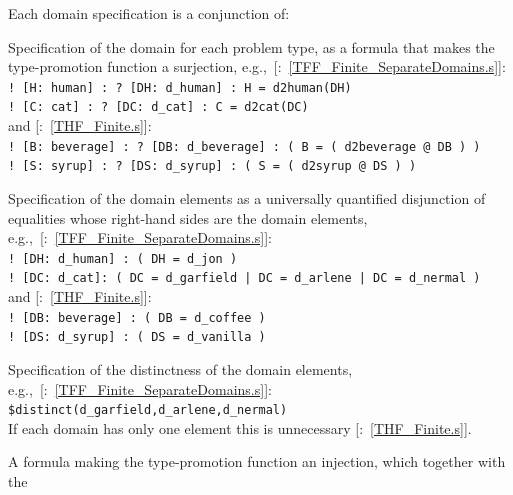 \documentclass{ceurart}
\newcommand{\smalltt}[1]{\small \texttt{#1}}
\newcommand{\example}{{\scriptsize \faFile[regular]}}
\newenvironment{packed_itemize}{
\vspace*{-0.3em}
\begin{itemize}
\setlength{\partopsep}{0pt}
\setlength{\itemsep}{1pt}
\setlength{\parskip}{0pt}
\setlength{\parsep}{0pt}
}{\end{itemize}}
\begin{document}
Each domain specification is a conjunction of:
\begin{packed_itemize}
\item Specification of the domain for each problem type, as a formula that makes the 
      type-promotion function a surjection, 
      e.g.,~[\example{}:~\ref{TFF_Finite_SeparateDomains.s}]:\\
      \hspace*{0.5cm}\smalltt{! [H: human] : ? [DH: d\_human] : H = d2human(DH)}\\
      \hspace*{0.5cm}\smalltt{! [C: cat] : ? [DC: d\_cat] : C = d2cat(DC)}\\
      and [\example{}:~\ref{THF_Finite.s}]:\\
      \hspace*{0.5cm}\smalltt{! [B: beverage] : ? [DB: d\_beverage] : ( B = ( d2beverage @ DB ) )}\\
      \hspace*{0.5cm}\smalltt{! [S: syrup] : ? [DS: d\_syrup] : ( S = ( d2syrup @ DS ) )}
\item Specification of the domain elements as a universally quantified disjunction of equalities 
      whose right-hand sides are the domain elements, 
      e.g.,~[\example{}:~\ref{TFF_Finite_SeparateDomains.s}]:\\
      \hspace*{0.5cm}\smalltt{! [DH: d\_human] : ( DH = d\_jon )}\\
      \hspace*{0.5cm}\smalltt{! [DC: d\_cat]: ( DC = d\_garfield | DC = d\_arlene | DC = d\_nermal )}\\
      and [\example{}:~\ref{THF_Finite.s}]:\\
      \hspace*{0.5cm}\smalltt{! [DB: beverage] : ( DB = d\_coffee )}\\
      \hspace*{0.5cm}\smalltt{! [DS: d\_syrup] : ( DS = d\_vanilla )}
\item Specification of the distinctness of the domain elements, 
      e.g.,~[\example{}:~\ref{TFF_Finite_SeparateDomains.s}]:\\
      \hspace*{0.5cm}\smalltt{\$distinct(d\_garfield,d\_arlene,d\_nermal)}\\
      If each domain has only one element this is unnecessary [\example{}:~\ref{THF_Finite.s}].
\item A formula making the type-promotion function an injection, which together with the 

\end{packed_itemize}
\end{document}
